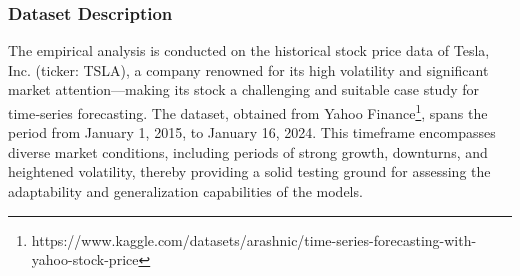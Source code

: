 \documentclass{cys}
\begin{document}
\begin{enumerate}

\subsubsection{Dataset Description}
The empirical analysis is conducted on the historical stock price data of Tesla, Inc. (ticker: TSLA), a company renowned for its high volatility and significant market attention—making its stock a challenging and suitable case study for time‑series forecasting. The dataset, obtained from Yahoo Finance\footnote{https://www.kaggle.com/datasets/arashnic/time-series-forecasting-with-yahoo-stock-price}, spans the period from January 1, 2015, to January 16, 2024. This timeframe encompasses diverse market conditions, including periods of strong growth, downturns, and heightened volatility, thereby providing a solid testing ground for assessing the adaptability and generalization capabilities of the models.


\end{enumerate}
\end{document}

